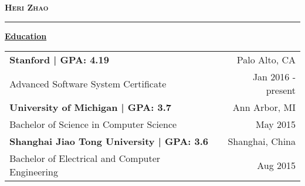 \documentclass[12pt]{article}
\begin{document}
    \thispagestyle{empty}

    \noindent\begin{multicols}{3}
    \columnbreak
    \begin{center}\textsc{\textbf{\LARGE{Heri Zhao}}}\end{center}
    \columnbreak
    \end{multicols}\vspace{-0.9em}
    \hrule height 0.4pt
    
    \begin{center}\textrm{\textbf{\large{\underline{Education}}}}\end{center}
    \begin{tabularx}{\textwidth}{X r}
        \small{\textsf{\textbf{Stanford | GPA: 4.19}}} & \small{\textsf{Palo Alto, CA}} \\
        \small{\textsf{Advanced Software System Certificate}} & \small{\textsf{Jan 2016 - present}} \\
        \small{\textsf{\textbf{University of Michigan | GPA: 3.7}}} & \small{\textsf{Ann Arbor, MI}} \\
        \small{\textsf{Bachelor of Science in Computer Science}} & \small{\textsf{May 2015}} \\
        \small{\textsf{\textbf{Shanghai Jiao Tong University | GPA: 3.6}}} & \small{\textsf{Shanghai, China}} \\
        \small{\textsf{Bachelor of Electrical and Computer Engineering}} & \small{\textsf{Aug 2015}}
    \end{tabularx}
    
\end{document}
